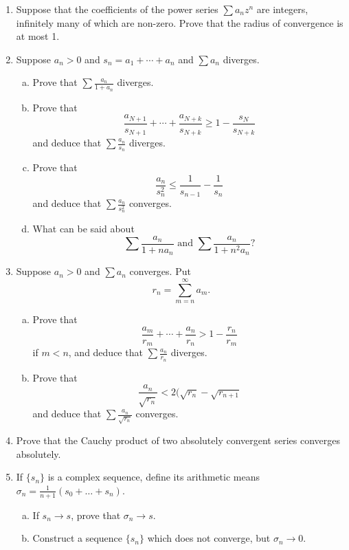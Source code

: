 \documentclass{scrbook}
\renewcommand{\to}{\rightarrow}
\begin{document}
\begin{enumerate}
\item %
Suppose that the coefficients of the power series $\sum a_nz^n$ are integers, infinitely many of which are non-zero. Prove that the radius of convergence is at most 1.

\item %
Suppose $a_n > 0$ and $s_n = a_1 + \dotsb + a_n$ and $\sum a_n$ diverges.
\begin{enumerate}[(a)]
\item Prove that $\sum \frac{a_n}{1 + a_n}$ diverges.

\item Prove that
\[
	\frac{a_{N+1}}{s_{N+1}} + \dotsb + \frac{a_{N+k}}{s_{N+k}} \ge 1 - \frac{s_N}{s_{N+k}}
\]
and deduce that $\sum \frac{a_n}{s_n}$ diverges.

\item Prove that
\[
	\frac{a_n}{s_n^2} \le \frac{1}{s_{n-1}} - \frac{1}{s_n}
\]
and deduce that $\sum \frac{a_n}{s_n^2}$ converges.

\item What can be said about
\[
	\sum \frac{a_n}{1 + na_n} \text{ and } \sum \frac{a_n}{1 + n^2 a_n} \text{?}
\]
\end{enumerate}

\item %
Suppose $a_n > 0$ and $\sum a_n$ converges. Put
\[
	r_n = \sum_{m=n}^{\infty} a_m.
\]
\begin{enumerate}[(a)]
\item Prove that
\[
	\frac{a_m}{r_m} + \dotsb + \frac{a_n}{r_n} > 1 - \frac{r_n}{r_m}
\]
if $m < n$, and deduce that $\sum \frac{a_n}{r_n}$ diverges.

\item Prove that
\[
	\frac{a_n}{\sqrt{r_n}} < 2 (\sqrt{r_n} - \sqrt{r_{n+1}}
\]
and deduce that $\sum \frac{a_n}{\sqrt{r_n}}$ converges.
\end{enumerate}

\item %
Prove that the Cauchy product of two absolutely convergent series converges absolutely.

\item %
If $\{s_n\}$ is a complex sequence, define its arithmetic means $\sigma_n = \frac{1}{n + 1} (s_0 + \dotsc + s_n)$. 
\begin{enumerate}[(a)]
\item If $s_n \to s$, prove that $\sigma_n \to s$.

\item Construct a sequence $\{s_n\}$ which does not converge, but $\sigma_n \to 0$. 


\end{enumerate}
\end{enumerate}
\end{document}
